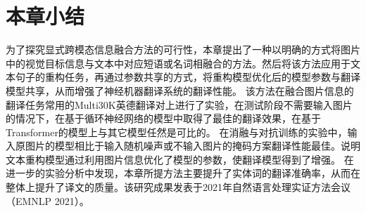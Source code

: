 






\section{本章小结}
为了探究显式跨模态信息融合方法的可行性，本章提出了一种以明确的方式将图片中的视觉目标信息与文本中对应短语或名词相融合的方法。然后将该方法应用于文本句子的重构任务，再通过参数共享的方式，将重构模型优化后的模型参数与翻译模型共享，从而增强了神经机器翻译系统的翻译性能。
该方法在融合图片信息的翻译任务常用的Multi30K英德翻译对上进行了实验，在测试阶段不需要输入图片的情况下，在基于循环神经网络的模型中取得了最佳的翻译效果，在基于Transformer的模型上与其它模型任然是可比的。
在消融与对抗训练的实验中，输入原图片的模型相比于输入随机噪声或不输入图片的掩码方案翻译性能最佳。说明文本重构模型通过利用图片信息优化了模型的参数，使翻译模型得到了增强。
在进一步的实验分析中发现，本章所提方法主要提升了实体词的翻译准确率，从而在整体上提升了译文的质量。该研究成果发表于2021年自然语言处理实证方法会议（EMNLP 2021）。

